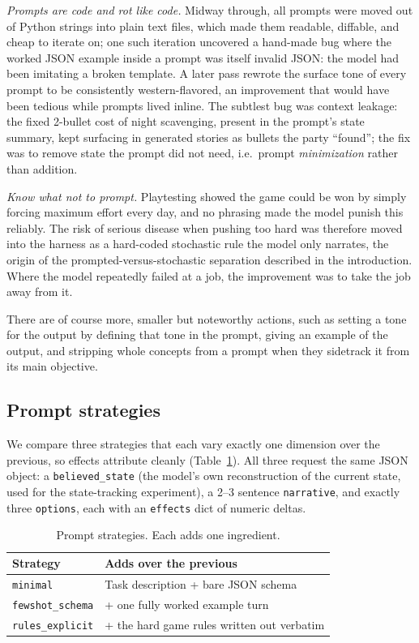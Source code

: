 \documentclass{article}
\begin{document}
\emph{Prompts are code and rot like code.} Midway through, all prompts were moved out of
Python strings into plain text files, which made them readable, diffable, and cheap to
iterate on; one such iteration uncovered a hand-made bug where the worked JSON example
inside a prompt was itself invalid JSON: the model had been imitating a broken template.
A later pass rewrote the surface tone of every prompt to be consistently western-flavored,
an improvement that would have been tedious while prompts lived inline. The subtlest bug
was context leakage: the fixed 2-bullet cost of night scavenging, present in the prompt's
state summary, kept surfacing in generated stories as bullets the party ``found''; the fix
was to remove state the prompt did not need, i.e.\ prompt \emph{minimization} rather than
addition.

\emph{Know what not to prompt.} Playtesting showed the game could be won by simply forcing
maximum effort every day, and no phrasing made the model punish this reliably. The risk of
serious disease when pushing too hard was therefore moved into the harness as a hard-coded
stochastic rule the model only narrates, the origin of the prompted-versus-stochastic
separation described in the introduction. Where the model repeatedly failed at a job, the
improvement was to take the job away from it.

There are of course more, smaller but noteworthy actions, such as setting a tone for the
output by defining that tone in the prompt, giving an example of the output, and stripping
whole concepts from a prompt when they sidetrack it from its main objective.

\subsection{Prompt strategies}
\label{sec:strategies}
We compare three strategies that each vary exactly one dimension over the previous, so
effects attribute cleanly (Table~\ref{tab:strategies}). All three request the same JSON
object: a \texttt{believed\_state} (the model's own reconstruction of the current state,
used for the state-tracking experiment), a 2--3 sentence \texttt{narrative}, and exactly
three \texttt{options}, each with an \texttt{effects} dict of numeric deltas.

\begin{table}[t]
\caption{Prompt strategies. Each adds one ingredient.}
\label{tab:strategies}
\centering
\small
\begin{tabular}{lp{4.6cm}}
\toprule
Strategy & Adds over the previous \\
\midrule
\texttt{minimal} & Task description + bare JSON schema \\
\texttt{fewshot\_schema} & + one fully worked example turn \\
\texttt{rules\_explicit} & + the hard game rules written out verbatim \\
\bottomrule
\end{tabular}
\end{table}
\end{document}
